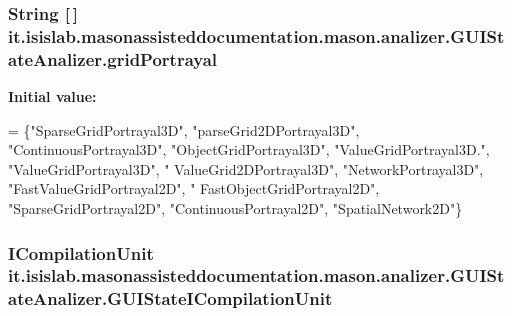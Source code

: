 \hypertarget{classit_1_1isislab_1_1masonassisteddocumentation_1_1mason_1_1analizer_1_1_g_u_i_state_analizer_a8115999619182e42482a6682bcae825e}{
\subsubsection[{grid\-Portrayal}]{\setlength{\rightskip}{0pt plus 5cm}String \mbox{[}$\,$\mbox{]} it.\-isislab.\-masonassisteddocumentation.\-mason.\-analizer.\-G\-U\-I\-State\-Analizer.\-grid\-Portrayal\hspace{0.3cm}{\ttfamily [static]}}}\label{classit_1_1isislab_1_1masonassisteddocumentation_1_1mason_1_1analizer_1_1_g_u_i_state_analizer_a8115999619182e42482a6682bcae825e}
{\bfseries Initial value\-:}
\begin{DoxyCode}
= \{\textcolor{stringliteral}{"SparseGridPortrayal3D"}, \textcolor{stringliteral}{"parseGrid2DPortrayal3D"}, \textcolor{stringliteral}{"ContinuousPortrayal3D"},
                                \textcolor{stringliteral}{"ObjectGridPortrayal3D"}, \textcolor{stringliteral}{"ValueGridPortrayal3D."}, \textcolor{stringliteral}{"ValueGridPortrayal3D"}, \textcolor{stringliteral}{"
      ValueGrid2DPortrayal3D"},
                                \textcolor{stringliteral}{"NetworkPortrayal3D"}, \textcolor{stringliteral}{"FastValueGridPortrayal2D"}, \textcolor{stringliteral}{"
      FastObjectGridPortrayal2D"}, \textcolor{stringliteral}{"SparseGridPortrayal2D"},
                                \textcolor{stringliteral}{"ContinuousPortrayal2D"}, \textcolor{stringliteral}{"SpatialNetwork2D"}\}
\end{DoxyCode}
\hypertarget{classit_1_1isislab_1_1masonassisteddocumentation_1_1mason_1_1analizer_1_1_g_u_i_state_analizer_a97ddb14f2f8fe4b54e6accc3bce4bee3}{
\subsubsection[{G\-U\-I\-State\-I\-Compilation\-Unit}]{\setlength{\rightskip}{0pt plus 5cm}I\-Compilation\-Unit it.\-isislab.\-masonassisteddocumentation.\-mason.\-analizer.\-G\-U\-I\-State\-Analizer.\-G\-U\-I\-State\-I\-Compilation\-Unit\hspace{0.3cm}{\ttfamily [private]}}}\label{classit_1_1isislab_1_1masonassisteddocumentation_1_1mason_1_1analizer_1_1_g_u_i_state_analizer_a97ddb14f2f8fe4b54e6accc3bce4bee3}
